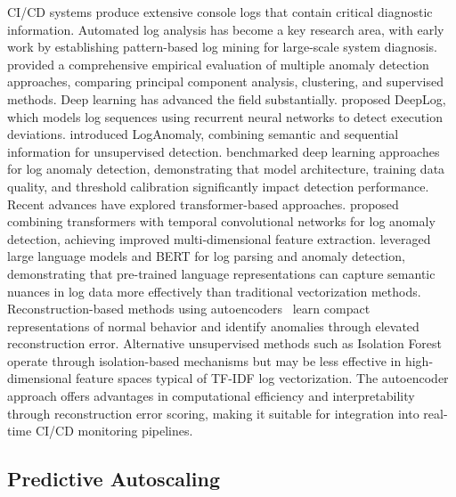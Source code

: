\documentclass[a4paper,fleqn]{cas-dc}
\begin{document}
CI/CD systems produce extensive console logs that contain critical diagnostic information.
Automated log analysis has become a key research area, with early work by \citet{xu2009logmining} establishing pattern-based log mining for large-scale system diagnosis.
\citet{he2016experience} provided a comprehensive empirical evaluation of multiple anomaly detection approaches, comparing principal component analysis, clustering, and supervised methods.
Deep learning has advanced the field substantially. \citet{du2017deeplog} proposed DeepLog, which models log sequences using recurrent neural networks to detect execution deviations.
\citet{meng2019loganomaly} introduced LogAnomaly, combining semantic and sequential information for unsupervised detection.
\citet{le2022log} benchmarked deep learning approaches for log anomaly detection, demonstrating that model architecture, training data quality, and threshold calibration significantly impact detection performance.
Recent advances have explored transformer-based approaches. \citet{liao2025logtransformer} proposed combining transformers with temporal convolutional networks for log anomaly detection, achieving improved multi-dimensional feature extraction.
\citet{zhou2024logllm} leveraged large language models and BERT for log parsing and anomaly detection, demonstrating that pre-trained language representations can capture semantic nuances in log data more effectively than traditional vectorization methods.
Reconstruction-based methods using autoencoders~\citep{sakurada2014anomaly} learn compact representations of normal behavior and identify anomalies through elevated reconstruction error.
Alternative unsupervised methods such as Isolation Forest~\citep{liu2008isolation} operate through isolation-based mechanisms but may be less effective in high-dimensional feature spaces typical of TF-IDF log vectorization.
The autoencoder approach offers advantages in computational efficiency and interpretability through reconstruction error scoring, making it suitable for integration into real-time CI/CD monitoring pipelines.

\subsection{Predictive Autoscaling}\label{subsec:autoscaling}
\end{document}
